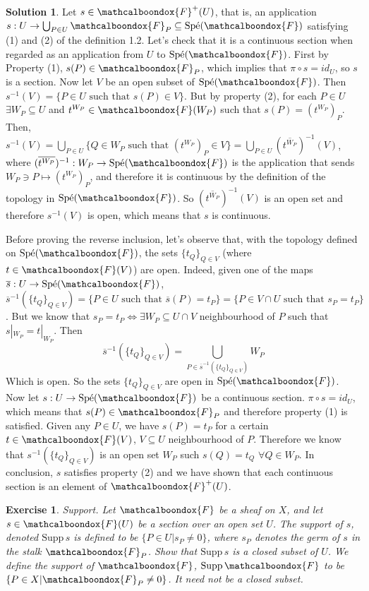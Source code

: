 \documentclass[12pt]{article}
\newcommand{\spe}{\ensuremath{\mathrm{Sp\acute{e}}}}
\newtheorem{ex}{Exercise}[section]
\theoremstyle{definition}
\newtheorem*{sol}{Solution}
\newcommand{\sF}{\ensuremath{\mathcalboondox{F}}}
\begin{document}
\begin{sol}
	Let $s \in \sF^{+}(U)$, that is, an application $s: U \to \bigcup_{P \in U} \sF_P \subseteq \spe(\sF)$ satisfying (1) and (2) of the definition 1.2. Let's check that it is a continuous section when regarded as an application from $U$ to $\spe(\sF)$. First by Property (1), $s(P) \in \sF_P$, which implies that $\pi \circ s = id_U$, so $s$ is a section. Now let $V$ be an open subset of $\spe(\sF)$. Then $s^{-1}(V) = \{P \in U \text{ such that } s(P) \in V\}$. But by property (2), for each $P \in U$ $\exists W_P \subseteq U$ and $t^{W_P} \in \sF(W_P)$ such that $s(P) = (t^{W_P})_P$. Then, $s^{-1}(V) = \bigcup_{P \in U} \{Q \in W_P \text{ such that } (t^{W_P})_P \in V\}  = \bigcup_{P \in U} (\overline{t^{W_P}})^{-1}(V)$, where $(\overline{t^{W_P}})^{-1}: W_P \to \spe(\sF)$ is the application that sends $W_P \ni P \mapsto (t^{W_P})_P$, and therefore it is continuous by the definition of the topology in $\spe(\sF)$. So $(\overline{t^{W_P}})^{-1}(V)$ is an open set and therefore $s^{-1}(V)$ is open, which means that $s$ is continuous.

	Before proving the reverse inclusion, let's observe that, with the topology defined on $\spe(\sF)$, the sets $\{t_Q\}_{Q \in V}$ (where $t \in \sF(V)$) are open. Indeed, given one of the maps $\overline{s}: U \to \spe(\sF)$, $\overline{s}^{-1}(\{t_Q\}_{Q \in V}) = \{P \in U \text{ such that } \overline{s}(P) = t_P \} = \{P \in V \cap U \text{ such that } s_P = t_P\}$. But we know that $s_P = t_P \iff \exists W_P \subseteq U \cap V$ neighbourhood of $P$ such that $s|_{W_P} = t|_{W_P}$. Then
	\[
		\overline{s}^{-1}(\{t_Q\}_{Q \in V}) = \bigcup_{P \in \overline{s}^{-1}(\{t_Q\}_{Q \in V})} W_P
	\]
	Which is open. So the sets $\{t_Q\}_{Q \in V}$ are open in $\spe(\sF)$.	Now let $s: U \to \spe(\sF)$ be a continuous section. $\pi \circ s = id_U$, which means that $s(P) \in \sF_P$ and therefore property (1) is satisfied. Given any $P \in U$, we have $s(P) = t_P$ for a certain $t \in \sF(V)$, $V \subseteq U$ neighbourhood of $P$. Therefore we know that $s^{-1}(\{t_Q\}_{Q \in V})$ is an open set $W_P$ such $s(Q) = t_Q \, \, \forall Q \in W_P$. In conclusion, $s$ satisfies property (2) and we have shown that each continuous section is an element of $\sF^+(U)$.
\end{sol}

\begin{ex}
	Support. Let $\sF$ be a sheaf on $X$, and let $s \in \sF(U)$ be a section over an open set $U$. The support of $s$, denoted $\mathrm{Supp} \, s$ is defined to be $\{P \in U |s_P \neq 0\}$, where $s_P$ denotes the germ of $s$ in the stalk $\sF_P$. Show that $\mathrm{Supp} \, s$ is a closed subset of $U$. We define the support of $\sF$, $\mathrm{Supp} \, \sF$ to be $\{P \in X | \sF_P \neq 0\}$. It need not be a closed subset.
\end{ex}
\end{document}

